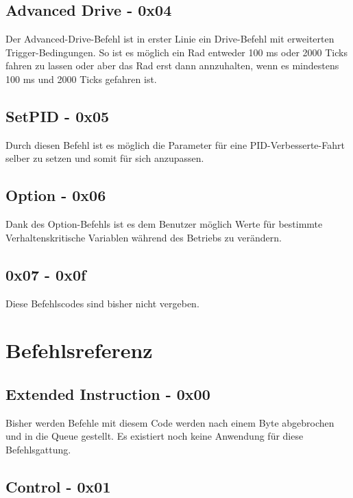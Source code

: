 \documentclass[a4paper]{article}
\begin{document}
	\subsection{Advanced Drive - 0x04}

	Der Advanced-Drive-Befehl ist in erster Linie ein Drive-Befehl mit erweiterten Trigger-Bedingungen. So ist es möglich
	ein Rad entweder 100 ms oder 2000 Ticks fahren zu lassen oder aber das Rad erst dann annzuhalten, wenn es mindestens
	100 ms und 2000 Ticks gefahren ist.

	\subsection{SetPID - 0x05}

	Durch diesen Befehl ist es möglich die Parameter für eine PID-Verbesserte-Fahrt selber zu setzen und somit für sich
	anzupassen.

	\subsection{Option - 0x06}

	Dank des Option-Befehls ist es dem Benutzer möglich Werte für bestimmte Verhaltenskritische Variablen während des
	Betriebs zu verändern.

	\subsection{0x07 - 0x0f}

	Diese Befehlscodes sind bisher nicht vergeben.


	\section{Befehlsreferenz}

	\subsection{Extended Instruction - 0x00}

	Bisher werden Befehle mit diesem Code werden nach einem Byte abgebrochen und in die Queue gestellt. Es existiert noch
	keine Anwendung für diese Befehlsgattung.

	\subsection{Control - 0x01}
\end{document}
